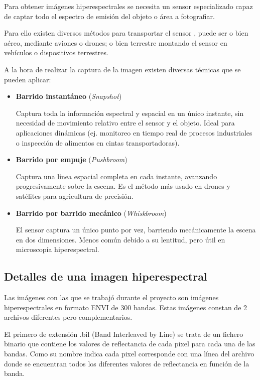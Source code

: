 Para obtener imágenes hiperespectrales se necesita un sensor especializado capaz de captar todo el espectro de emisión del objeto o área a fotografiar. 

Para ello existen diversos métodos para transportar el sensor\cite{Prez2018ComputacinDA} , puede ser o bien aéreo, mediante aviones o drones; o bien terrestre montando el sensor en vehículos o dispositivos terrestres.

A la hora de realizar la captura de la imagen existen diversas técnicas que se pueden aplicar:

\begin{itemize}
\item \textbf{Barrido instantáneo} (\textit{Snapshot})

Captura toda la información espectral y espacial en un único instante, sin necesidad de movimiento relativo entre el sensor y el objeto. Ideal para aplicaciones dinámicas (ej. monitoreo en tiempo real de procesos industriales o inspección de alimentos en cintas transportadoras).

\item \textbf{Barrido por empuje} (\textit{Pushbroom})

Captura una línea espacial completa en cada instante, avanzando progresivamente sobre la escena. Es el método más usado en drones y satélites para agricultura de precisión.

\item \textbf{Barrido por barrido mecánico} (\textit{Whiskbroom})

El sensor captura un único punto por vez, barriendo mecánicamente la escena en dos dimensiones. Menos común debido a su lentitud, pero útil en microscopía hiperespectral.
 
\end{itemize}

\subsection{Detalles de una imagen hiperespectral}
Las imágenes con las que se trabajó durante el proyecto son imágenes hiperespectrales en formato ENVI de 300 bandas. Estas imágenes constan de 2 archivos diferentes pero complementarios. 

El primero de extensión .bil (Band Interleaved by Line) se trata de un fichero binario que contiene los valores de reflectancia de cada pixel para cada una de las bandas. Como su nombre indica cada pixel corresponde con una línea del archivo donde se encuentran todos los diferentes valores de reflectancia en función de la banda.

